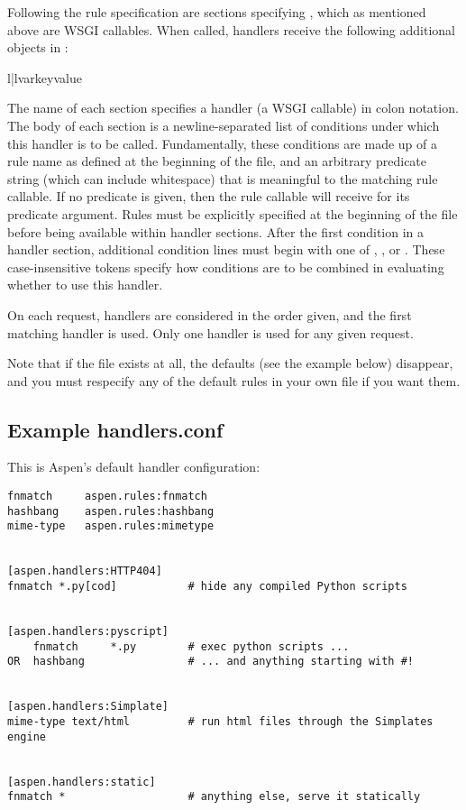 Following the rule specification are sections specifying , which
as mentioned above are WSGI callables. When called, handlers receive the
following additional objects in :

\begin{tableii}{l|l}{var}{key}{value}
\end{tableii}

The name of each section specifies a handler (a WSGI callable) in colon
notation. The body of each section is a newline-separated list of conditions
under which this handler is to be called. Fundamentally, these conditions are
made up of a rule name as defined at the beginning of the file, and an arbitrary
predicate string (which can include whitespace) that is meaningful to the
matching rule callable. If no predicate is given, then the rule callable will
receive  for its predicate argument. Rules must be explicitly
specified at the beginning of the file before being available within handler
sections. After the first condition in a handler section, additional condition
lines must begin with one of , , or . These
case-insensitive tokens specify how conditions are to be combined in evaluating
whether to use this handler.

On each request, handlers are considered in the order given, and the first
matching handler is used. Only one handler is used for any given request.

Note that if the file  exists at all, the defaults
(see the example below) disappear, and you must respecify any of the default
rules in your own file if you want them.


\subsection{Example handlers.conf \label{handlers.conf}}
This is Aspen's default handler configuration:

\begin{verbatim}
fnmatch     aspen.rules:fnmatch
hashbang    aspen.rules:hashbang
mime-type   aspen.rules:mimetype


[aspen.handlers:HTTP404]
fnmatch *.py[cod]           # hide any compiled Python scripts


[aspen.handlers:pyscript]
    fnmatch     *.py        # exec python scripts ...
OR  hashbang                # ... and anything starting with #!


[aspen.handlers:Simplate]
mime-type text/html         # run html files through the Simplates engine


[aspen.handlers:static]
fnmatch *                   # anything else, serve it statically
\end{verbatim}


